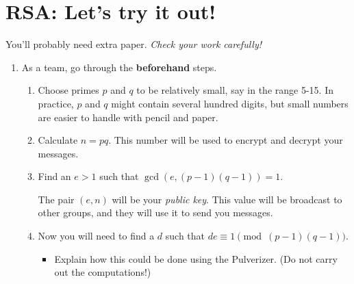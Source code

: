 \documentclass[12pt]{article}
\begin{document}
\section{RSA: Let's try it out!}
You'll probably need extra paper.  \textit{Check your work carefully!}
\begin{enumerate}

\item 
As a team, go through the \textbf{beforehand} steps.
\begin{enumerate}

\item
Choose primes $p$ and $q$ to be relatively small, say in the
range 5-15.  In practice, $p$ and $q$ might contain several hundred
digits, but small numbers are easier to handle with pencil and paper.


\item
Calculate $n=pq$. This number will be used to encrypt and decrypt your messages.


\item
Find an $e>1$ such that $\gcd(e, (p-1)(q-1)) = 1$.

The pair $(e,n)$ will be your \textit{public key}. This value will be broadcast to other groups, and they will use it to send you messages.


\item Now you will need to find a $d$ such that $de \equiv 1 \pmod{(p-1)(q-1)}$.

\begin{itemize}
\item
Explain how this could be done using the Pulverizer. (Do not carry out the computations!)
\end{itemize}



\end{enumerate}
\end{enumerate}
\end{document}
